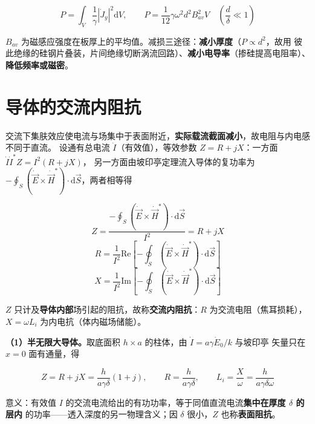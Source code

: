 \begin{formulaBox}
\[
P=\int_{V}\frac{1}{\gamma}\left|\dot{J}_y\right|^{2}\mathrm{d}V,
\qquad
P=\frac{1}{12}\gamma\omega^{2}d^{2}B_{av}^{2}V
\quad\left(\frac{d}{\delta}\ll1\right)
\]
\end{formulaBox}
$B_{av}$ 为磁感应强度在板厚上的平均值。减损三途径：\textbf{减小厚度}（$P\propto d^{2}$，故用
彼此绝缘的硅钢片叠装，片间绝缘切断涡流回路）、\textbf{减小电导率}（掺硅提高电阻率）、
\textbf{降低频率或磁密}。


\section{导体的交流内阻抗}

交流下集肤效应使电流与场集中于表面附近，\textbf{实际载流截面减小}，故电阻与内电感不同于直流。
设通有总电流 $\dot{I}$（有效值），等效参数 $Z=R+jX$：一方面 $\dot{I}\dot{I}^{*}Z=I^{2}(R+jX)$，
另一方面由坡印亭定理流入导体的复功率为
$-\oint_S(\dot{\vec{E}}\times\dot{\vec{H}}^{*})\cdot \mathrm{d}\vec{S}$，两者相等得

\begin{formulaBox}
\[
Z=\frac{-\oint_{S}\left(\dot{\vec{E}}\times\dot{\vec{H}}^{*}\right)
\cdot \mathrm{d}\vec{S}}{I^{2}}=R+jX
\]
\[
R=\frac{1}{I^{2}}\mathrm{Re}\left[-\oint_{S}
\left(\dot{\vec{E}}\times\dot{\vec{H}}^{*}\right)\cdot \mathrm{d}\vec{S}\right]
\]
\[
X=\frac{1}{I^{2}}\mathrm{Im}\left[-\oint_{S}
\left(\dot{\vec{E}}\times\dot{\vec{H}}^{*}\right)\cdot \mathrm{d}\vec{S}\right]
\]
\end{formulaBox}
$Z$ 只计及\textbf{导体内部}场引起的阻抗，故称\textbf{交流内阻抗}：$R$ 为交流电阻（焦耳损耗），
$X=\omega L_i$ 为内电抗（体内磁场储能）。

\textbf{（1）半无限大导体。}取底面积 $h\times a$ 的柱体，由 $\dot{I}=a\gamma\dot{E}_0/k$ 与坡印亭
矢量只在 $x=0$ 面有通量，得

\begin{formulaBox}
\[
Z=R+jX=\frac{h}{a\gamma\delta}(1+j),
\qquad
R=\frac{h}{a\gamma\delta},
\qquad
L_i=\frac{X}{\omega}=\frac{h}{a\gamma\delta\omega}
\]
\end{formulaBox}
意义：有效值 $I$ 的交流电流给出的有功功率，等于同值直流电流\textbf{集中在厚度 $\delta$ 的层内}
的功率——透入深度的另一物理含义；因 $\delta$ 很小，$Z$ 也称\textbf{表面阻抗}。

